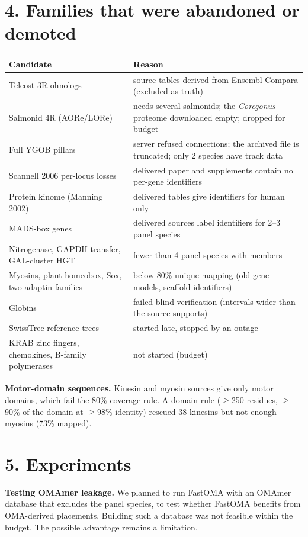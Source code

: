 \documentclass[10pt]{article}
\begin{document}
\section*{4. Families that were abandoned or demoted}
\begin{tabular}{p{4cm}p{11cm}}
\toprule
Candidate & Reason \\
\midrule
Teleost 3R ohnologs & source tables derived from Ensembl Compara (excluded as truth) \\
Salmonid 4R (AORe/LORe) & needs several salmonids; the \textit{Coregonus} proteome downloaded empty; dropped for budget \\
Full YGOB pillars & server refused connections; the archived file is truncated; only 2 species have track data \\
Scannell 2006 per-locus losses & delivered paper and supplements contain no per-gene identifiers \\
Protein kinome (Manning 2002) & delivered tables give identifiers for human only \\
MADS-box genes & delivered sources label identifiers for 2--3 panel species \\
Nitrogenase, GAPDH transfer, GAL-cluster HGT & fewer than 4 panel species with members \\
Myosins, plant homeobox, Sox, two adaptin families & below 80\% unique mapping (old gene models, scaffold identifiers) \\
Globins & failed blind verification (intervals wider than the source supports) \\
SwissTree reference trees & started late, stopped by an outage \\
KRAB zinc fingers, chemokines, B-family polymerases & not started (budget) \\
\bottomrule
\end{tabular}

\textbf{Motor-domain sequences.} Kinesin and myosin sources give only motor domains, which fail the 80\% coverage
rule. A domain rule ($\geq$250 residues, $\geq$90\% of the domain at $\geq$98\% identity) rescued 38 kinesins but not
enough myosins (73\% mapped).

\section*{5. Experiments}
\textbf{Testing OMAmer leakage.} We planned to run FastOMA with an OMAmer database that excludes the panel species, to
test whether FastOMA benefits from OMA-derived placements. Building such a database was not feasible within the
budget. The possible advantage remains a limitation.
\end{document}
